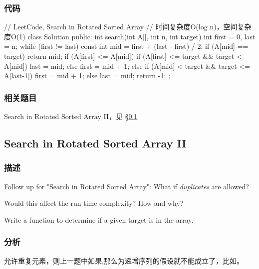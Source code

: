 \subsubsection{代码}
\begin{Code}
// LeetCode, Search in Rotated Sorted Array
// 时间复杂度O(log n)，空间复杂度O(1)
class Solution {
public:
    int search(int A[], int n, int target) {
        int first = 0, last = n;
        while (first != last) {
            const int mid = first  + (last - first) / 2;
            if (A[mid] == target)
                return mid;
            if (A[first] <= A[mid]) {
                if (A[first] <= target && target < A[mid])
                    last = mid;
                else
                    first = mid + 1;
            } else {
                if (A[mid] < target && target <= A[last-1])
                    first = mid + 1;
                else
                    last = mid;
            }
        }
        return -1;
    }
};
\end{Code}


\subsubsection{相关题目}

\begindot
\item Search in Rotated Sorted Array II，见 \S \ref{sec:search-in-rotated-sorted-array-ii}
\myenddot


\subsection{Search in Rotated Sorted Array II}
\label{sec:search-in-rotated-sorted-array-ii}


\subsubsection{描述}
Follow up for "Search in Rotated Sorted Array": What if \emph{duplicates} are allowed?

Would this affect the run-time complexity? How and why?

Write a function to determine if a given target is in the array.


\subsubsection{分析}
允许重复元素，则上一题中如果,那么\fn{[l,m]}为递增序列的假设就不能成立了，比如\code{[1,3,1,1,1]}。

